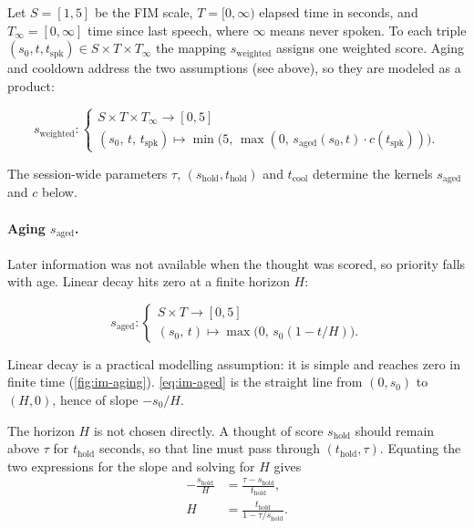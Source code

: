 Let \(S=[1,5]\) be the FIM scale, \(T=[0,\infty)\) elapsed time in seconds, and
\(T_{\infty}=[0,\infty]\) time since last speech, where \(\infty\) means never spoken.
To each triple \((s_0,t,t_{\mathrm{spk}})\in S\times T\times T_{\infty}\) the mapping
\(s_{\mathrm{weighted}}\) assigns one weighted score. Aging and cooldown address the two
assumptions (see above), so they are modeled as a product:

\begin{equation}
  s_{\mathrm{weighted}} :
  \begin{cases}
    S \times T \times T_{\infty} \to [0,5] \\
    (s_0,\, t,\, t_{\mathrm{spk}})
    \mapsto
    \min\bigl(5,\, \max(0,\, s_{\mathrm{aged}}(s_0,t)\cdot c(t_{\mathrm{spk}}))\bigr).
  \end{cases}
  \label{eq:im-weighted}
\end{equation}

The session-wide parameters \(\tau\), \((s_{\mathrm{hold}}, t_{\mathrm{hold}})\) and
\(t_{\mathrm{cool}}\) determine the kernels \(s_{\mathrm{aged}}\) and \(c\) below.

\paragraph{Aging \(s_{\mathrm{aged}}\).}
Later information was not available when the thought was scored, so priority falls with age.
Linear decay hits zero at a finite horizon \(H\):

\begin{equation}
  s_{\mathrm{aged}} :
  \begin{cases}
    S \times T \to [0,5] \\
    (s_0,\, t) \mapsto \max\bigl(0,\, s_0(1-t/H)\bigr).
  \end{cases}
  \label{eq:im-aged}
\end{equation}

Linear decay is a practical modelling assumption: it is simple and reaches zero in finite time
(\autoref{fig:im-aging}). \eqref{eq:im-aged} is the straight line from \((0,s_0)\) to \((H,0)\),
hence of slope \(-s_0/H\).

The horizon \(H\) is not chosen directly. A thought of score \(s_{\mathrm{hold}}\) should remain
above \(\tau\) for \(t_{\mathrm{hold}}\) seconds, so that line must pass through
\((t_{\mathrm{hold}},\tau)\). Equating the two expressions for the slope and solving for \(H\)
gives
\begin{equation}
  \begin{aligned}
    -\frac{s_{\mathrm{hold}}}{H}
    &= \frac{\tau-s_{\mathrm{hold}}}{t_{\mathrm{hold}}}, \\[0.35em]
    H
    &= \frac{t_{\mathrm{hold}}}{1-\tau/s_{\mathrm{hold}}}.
  \end{aligned}
  \label{eq:im-horizon}
\end{equation}

